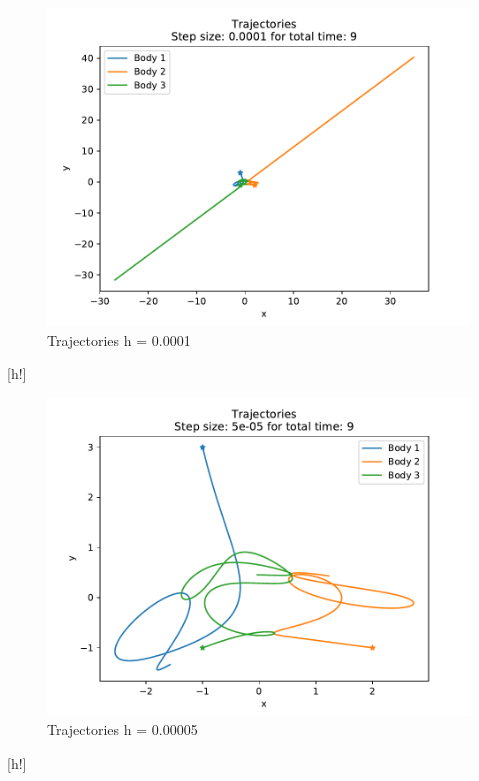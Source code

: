 \documentclass[12pt,a4paper,twoside]{article}
\begin{document}
\begin{figure}[h!]
   \centering
   \includegraphics[]{figs/exercise03_2_stepsize00001_time9.pdf}
   \caption{Trajectories h = 0.0001}
\end{figure}[h!]
\begin{figure}[h!]
  \centering
  \includegraphics[]{figs/exercise03_2_stepsize5e-05_time9.pdf}
  \caption{Trajectories h = 0.00005}
\end{figure}[h!]
\end{document}
